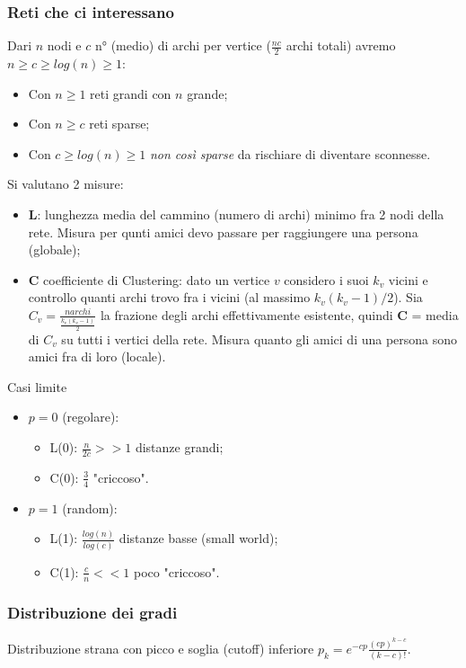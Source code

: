 \documentclass{article}
\begin{document}
    \subsubsection{Reti che ci interessano}
      Dari $n$ nodi e $c$ n° (medio) di archi per vertice ($\frac{nc}{2}$ archi totali) avremo $n\geq c\geq log(n)\geq 1$:
      \begin{itemize}
          \item Con $n\geq 1$ reti grandi con $n$ grande;
          \item Con $n\geq c$ reti sparse;
          \item Con $c\geq log(n)\geq 1$ \textit{non così sparse} da rischiare di diventare sconnesse.
      \end{itemize}
      Si valutano 2 misure:
      \begin{itemize}
          \item \textbf{L}: lunghezza media del cammino (numero di archi) minimo fra 2 nodi della rete. Misura per qunti amici devo passare per raggiungere una persona (globale);
          \item \textbf{C} coefficiente di Clustering: dato un vertice $v$ considero i suoi $k_v$ vicini e controllo quanti archi trovo fra i vicini (al massimo $k_v(k_v-1)/2$). Sia $C_v=\frac{n archi}{\frac{k_v(k_v-1)}{2}}$ la frazione degli archi effettivamente esistente, quindi \textbf{C} = media di $C_v$ su tutti i vertici della rete. Misura quanto gli amici di una persona sono amici fra di loro (locale).
      \end{itemize}
      Casi limite
      \begin{itemize}
          \item $p=0$ (regolare):
            \begin{itemize}
                \item L(0): $\frac{n}{2c} >> 1$ distanze grandi;
                \item C(0): $\frac{3}{4}$ "criccoso".
            \end{itemize}
          \item $p=1$ (random):
            \begin{itemize}
                \item L(1): $\frac{log(n)}{log(c)}$ distanze basse (small world);
                \item C(1): $\frac{c}{n} << 1$ poco "criccoso".
            \end{itemize}
      \end{itemize}
    \subsubsection{Distribuzione dei gradi}
      Distribuzione strana con picco e soglia (cutoff) inferiore $p_k=e^{-cp}\frac{(cp)^{k-c}}{(k-c)!}$.
\end{document}
